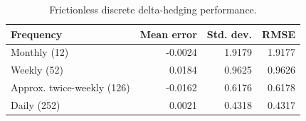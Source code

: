 \begin{table}[H]
\centering
\caption{Frictionless discrete delta-hedging performance.}
\label{tab:hedge}
\begin{tabular}{lrrr}
\toprule
Frequency & Mean error & Std. dev. & RMSE \\
\midrule
Monthly (12) & -0.0024 & 1.9179 & 1.9177 \\
Weekly (52) & 0.0184 & 0.9625 & 0.9626 \\
Approx. twice-weekly (126) & -0.0162 & 0.6176 & 0.6178 \\
Daily (252) & 0.0021 & 0.4318 & 0.4317 \\
\bottomrule
\end{tabular}
\end{table}
